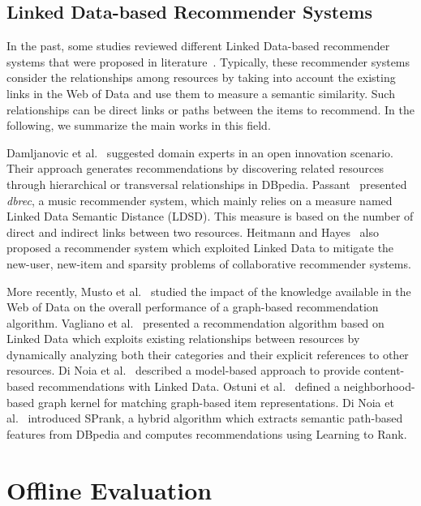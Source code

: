 \subsection{Linked Data-based Recommender Systems}
\label{soa:sec:linked-data}

In the past, some studies reviewed different Linked Data-based recommender systems that were proposed in literature~\cite{DiNoia2015, Figueroa2015}. Typically, these recommender systems consider the relationships among resources by taking into account the existing links in the Web of Data and use them to measure a semantic similarity. Such relationships can be direct links or paths between the items to recommend. In the following, we summarize the main works in this field. 

Damljanovic et al.~\cite{Damljanovic2012} suggested domain experts in an open innovation scenario. Their approach generates recommendations by discovering related resources through hierarchical or transversal relationships in DBpedia. Passant~\cite{Passant2010} presented \emph{dbrec}, a music recommender system, which mainly relies on a measure named Linked Data Semantic Distance (LDSD). This measure is based on the number of direct and indirect links between two resources. Heitmann and Hayes~\cite{Heitmann2010} also proposed a recommender system which exploited Linked Data to mitigate the new-user, new-item and sparsity problems of collaborative recommender systems.

More recently, Musto et al.~\cite{Musto2016} studied the impact of the knowledge available in the Web of Data on the overall performance of a graph-based recommendation algorithm. Vagliano et al.~\cite{Vagliano2016} presented a recommendation algorithm based on Linked Data which exploits existing relationships between resources by dynamically analyzing both their categories and their explicit references to other resources. Di Noia et al.~\cite{DiNoia2012} described a model-based approach to provide content-based recommendations with Linked Data. Ostuni et al.~\cite{Ostuni2014} defined a neighborhood-based graph kernel for matching graph-based item representations. Di Noia et al.~\cite{DiNoia2016} introduced SPrank, a hybrid algorithm which extracts semantic path-based features from DBpedia and computes recommendations using Learning to Rank.

\section{Offline Evaluation}
\label{soa:sec:evaluation}

